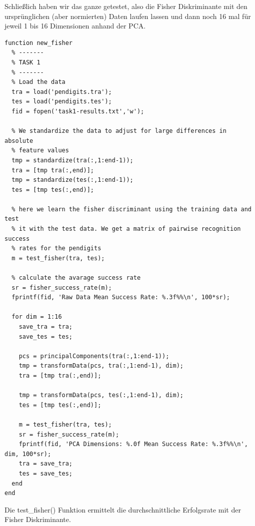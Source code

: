 \documentclass{article}
\begin{document}
Schließlich haben wir das ganze getestet, also die Fisher Diskriminante
mit den ursprünglichen (aber normierten) Daten laufen lassen und dann
noch 16 mal für jeweil 1 bis 16 Dimensionen anhand der PCA.
\begin{lstlisting}
function new_fisher
  % -------
  % TASK 1
  % -------
  % Load the data
  tra = load('pendigits.tra');
  tes = load('pendigits.tes');
  fid = fopen('task1-results.txt','w');
  
  % We standardize the data to adjust for large differences in absolute
  % feature values
  tmp = standardize(tra(:,1:end-1));
  tra = [tmp tra(:,end)];
  tmp = standardize(tes(:,1:end-1));
  tes = [tmp tes(:,end)];

  % here we learn the fisher discriminant using the training data and test
  % it with the test data. We get a matrix of pairwise recognition success
  % rates for the pendigits
  m = test_fisher(tra, tes);
  
  % calculate the avarage success rate
  sr = fisher_success_rate(m);
  fprintf(fid, 'Raw Data Mean Success Rate: %.3f%%\n', 100*sr);

  for dim = 1:16
    save_tra = tra;
    save_tes = tes;

    pcs = principalComponents(tra(:,1:end-1));
    tmp = transformData(pcs, tra(:,1:end-1), dim);
    tra = [tmp tra(:,end)];

    tmp = transformData(pcs, tes(:,1:end-1), dim);
    tes = [tmp tes(:,end)];

    m = test_fisher(tra, tes);
    sr = fisher_success_rate(m);
    fprintf(fid, 'PCA Dimensions: %.0f Mean Success Rate: %.3f%%\n', dim, 100*sr);
    tra = save_tra;
    tes = save_tes;
  end
end
\end{lstlisting} 
Die test\_fisher() Funktion ermittelt die durchschnittliche Erfolgsrate
mit der Fisher Diskriminante.
\end{document}
